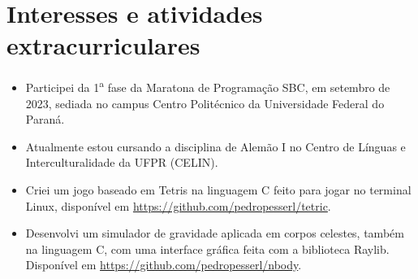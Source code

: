 \documentclass[a4paper, 12pt]{moderncv}
\begin{document}
\section{Interesses e atividades extracurriculares}
\vspace{4pt}
\begin{itemize}
    \item{Participei da 1\textsuperscript{a} fase da Maratona de Programação
        SBC, em setembro de 2023, sediada no campus Centro Politécnico da Universidade
        Federal do Paraná.}
    \vspace{4pt}
    \item{Atualmente estou cursando a disciplina de Alemão I no Centro de Línguas
        e Interculturalidade da UFPR (CELIN).}
    \vspace{4pt}
    \item{Criei um jogo baseado em Tetris na linguagem C feito para jogar no terminal
        Linux, disponível em \url{https://github.com/pedropesserl/tetric}.}
    \vspace{4pt}
    \item{Desenvolvi um simulador de gravidade aplicada em corpos celestes, também na linguagem C, com uma interface gráfica feita com a biblioteca Raylib. Disponível em \url{https://github.com/pedropesserl/nbody}.}
\end{itemize}
\end{document}
